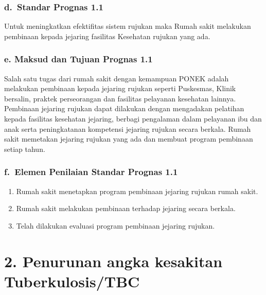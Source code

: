 \documentclass[
]{book}
\providecommand{\tightlist}{%
  \setlength{\itemsep}{0pt}\setlength{\parskip}{0pt}}
\begin{document}
\hypertarget{d.-standar-prognas-1.1}{%
\subsubsection*{d.~Standar Prognas 1.1}\label{d.-standar-prognas-1.1}}

Untuk meningkatkan efektifitas sistem rujukan maka Rumah sakit melakukan pembinaan kepada jejaring fasilitas Kesehatan rujukan yang ada.

\hypertarget{e.-maksud-dan-tujuan-prognas-1.1}{%
\subsubsection*{e. Maksud dan Tujuan Prognas 1.1}\label{e.-maksud-dan-tujuan-prognas-1.1}}

Salah satu tugas dari rumah sakit dengan kemampuan PONEK adalah melakukan pembinaan kepada jejaring rujukan seperti Puskesmas, Klinik bersalin, praktek perseorangan dan fasilitas pelayanan kesehatan lainnya. Pembinaan jejaring rujukan dapat dilakukan dengan mengadakan pelatihan kepada fasilitas kesehatan jejaring, berbagi pengalaman dalam pelayanan ibu dan anak serta peningkatanan kompetensi jejaring rujukan secara berkala. Rumah sakit memetakan jejaring rujukan yang ada dan membuat program pembinaan setiap tahun.

\hypertarget{f.-elemen-penilaian-standar-prognas-1.1}{%
\subsubsection*{f.~Elemen Penilaian Standar Prognas 1.1}\label{f.-elemen-penilaian-standar-prognas-1.1}}

\begin{enumerate}
\def\labelenumi{\arabic{enumi}.}
\tightlist
\item
  Rumah sakit menetapkan program pembinaan jejaring rujukan rumah sakit.
\item
  Rumah sakit melakukan pembinaan terhadap jejaring secara berkala.
\item
  Telah dilakukan evaluasi program pembinaan jejaring rujukan.
\end{enumerate}

\hypertarget{penurunan-angka-kesakitan-tuberkulosistbc}{%
\section*{2. Penurunan angka kesakitan Tuberkulosis/TBC}\label{penurunan-angka-kesakitan-tuberkulosistbc}}
\end{document}
